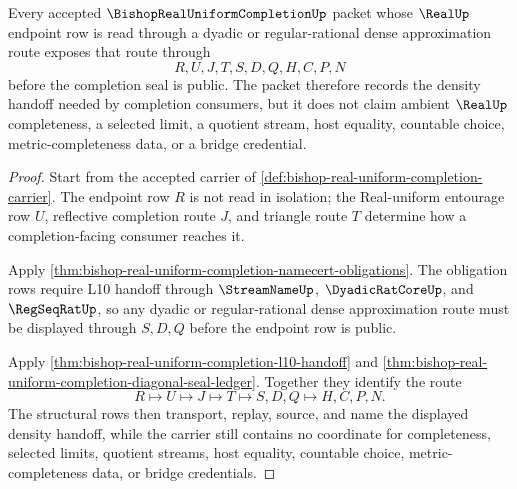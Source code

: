\begin{theorem}
\label{thm:bishop-real-uniform-completion-density}
Every accepted $\BishopRealUniformCompletionUp$ packet whose $\RealUp$ endpoint row is read through a dyadic or regular-rational dense approximation route exposes that route through
$$
R,U,J,T,S,D,Q,H,C,P,N
$$
before the completion seal is public. The packet therefore records the density handoff needed by completion consumers, but it does not claim ambient $\RealUp$ completeness, a selected limit, a quotient stream, host equality, countable choice, metric-completeness data, or a bridge credential.
\end{theorem}
\begin{proof}
Start from the accepted carrier of \autoref{def:bishop-real-uniform-completion-carrier}. The endpoint row $R$ is not read in isolation; the Real-uniform entourage row $U$, reflective completion route $J$, and triangle route $T$ determine how a completion-facing consumer reaches it.

Apply \autoref{thm:bishop-real-uniform-completion-namecert-obligations}. The obligation rows require L10 handoff through $\StreamNameUp$, $\DyadicRatCoreUp$, and $\RegSeqRatUp$, so any dyadic or regular-rational dense approximation route must be displayed through $S,D,Q$ before the endpoint row is public.

Apply \autoref{thm:bishop-real-uniform-completion-l10-handoff} and \autoref{thm:bishop-real-uniform-completion-diagonal-seal-ledger}. Together they identify the route
$$
R\longmapsto U\longmapsto J\longmapsto T\longmapsto S,D,Q\longmapsto H,C,P,N .
$$
The structural rows then transport, replay, source, and name the displayed density handoff, while the carrier still contains no coordinate for completeness, selected limits, quotient streams, host equality, countable choice, metric-completeness data, or bridge credentials.
\end{proof}

